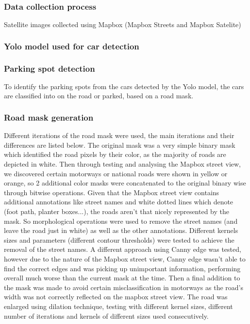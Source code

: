 \subsubsection{Data collection process}
Satellite images collected using Mapbox (Mapbox Streets and Mapbox Satelite)


\subsubsection{Yolo model used for car detection}


\subsubsection{Parking spot detection}
To identify the parking spots from the cars detected by the Yolo model, the cars are classified into on the road or parked, based on a road mask.

\subsubsection{Road mask generation}
Different iterations of the road mask were used, the main iterations and their differences are listed below.
The original mask was a very simple binary mask which identified the road pixels by their color, as the majority of roads are depicted in white.
Then through testing and analysing the Mapbox street view, we discovered certain motorways or national roads were shown in yellow or orange, so 2 additional color masks were concatenated to the original binary wise through bitwise operations.
Given that the Mapbox street view contains additional annotations like street names and white dotted lines which denote (foot path, planter boxes...), the roads aren't that nicely represented by the mask.
So morphological operations were used to remove the street names (and leave the road just in white) as well as the other annotations.
Different kernels sizes and parameters (different contour thresholds) were tested to achieve the removal of the street names.
A different approach using Canny edge was tested, however due to the nature of the Mapbox street view, Canny edge wasn't able to find the correct edges and was picking up unimportant information, performing overall much worse than the current mask at the time.
Then a final addition to the mask was made to avoid certain misclassification in motorways as the road's width was not correctly reflected on the mapbox street view. The road was enlarged using dilation technique, testing with different kernel sizes, different number of iterations and kernels of different sizes used consecutively.


